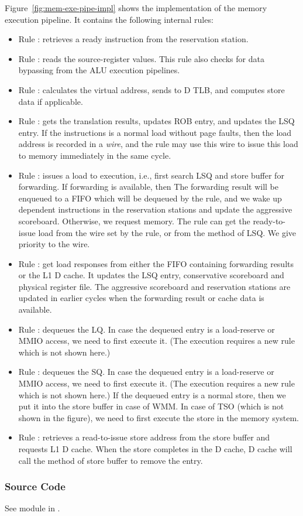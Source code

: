 Figure~\ref{fig:mem-exe-pipe-impl} shows the implementation of the memory execution pipeline.
It contains the following internal rules:
\begin{itemize}
    \item Rule : retrieves a ready instruction from the reservation station.
    \item Rule : reads the source-register values.
    This rule also checks for data bypassing from the ALU execution pipelines.
    \item Rule : calculates the virtual address, sends to D TLB, and computes store data if applicable.
    \item Rule : gets the translation results, updates ROB entry, and updates the LSQ entry.
    If the instructions is a normal load without page faults, then the load address is recorded in a \emph{wire}, and the  rule may use this wire to issue this load to memory immediately in the same cycle.
    \item Rule : issues a load to execution, i.e., first search LSQ and store buffer for forwarding.
    If forwarding is available, then The forwarding result will be enqueued to a FIFO which will be dequeued by the  rule, and we wake up dependent instructions in the reservation stations and update the aggressive scoreboard.
    Otherwise, we request memory.
    The  rule can get the ready-to-issue load from the wire set by the  rule, or from the  method of LSQ.
    We give priority to the wire.
    \item Rule : get load responses from either the FIFO containing forwarding results or the L1 D cache.
    It updates the LSQ entry, conservative scoreboard and physical register file.
    The aggressive scoreboard and reservation stations are updated in earlier cycles when the forwarding result or cache data is available.
    \item Rule : dequeues the LQ.
    In case the dequeued entry is a load-reserve or MMIO access, we need to first execute it.
    (The execution requires a new rule which is not shown here.)
    \item Rule : dequeues the SQ.
    In case the dequeued entry is a load-reserve or MMIO access, we need to first execute it.
    (The execution requires a new rule which is not shown here.)
    If the dequeued entry is a normal store, then we put it into the store buffer in case of WMM.
    In case of TSO (which is not shown in the figure), we need to first execute the store in the memory system.
    \item Rule : retrieves a read-to-issue store address from the store buffer and requests L1 D cache.
    When the store completes in the D cache, D cache will call the  method of store buffer to remove the entry.
\end{itemize}

\subsubsection{Source Code}
See module  in .
